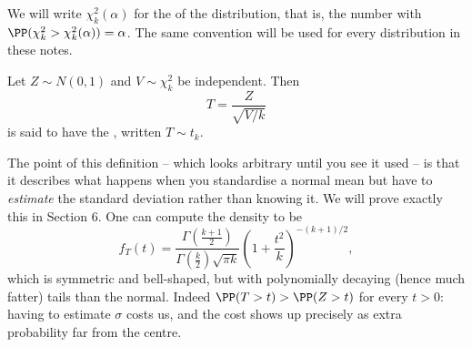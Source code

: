 We will write $\chi^2_k(\alpha)$ for the  of the distribution, that is, the number with $\PP(\chi^2_k > \chi^2_k(\alpha)) = \alpha$. The same convention will be used for every distribution in these notes.

\begin{definition}
  Let $Z \sim N(0,1)$ and $V \sim \chi^2_k$ be independent. Then
  $$
  T = \frac{Z}{\sqrt{V/k}}
  $$
  is said to have the , written $T \sim t_k$.
\end{definition}

The point of this definition -- which looks arbitrary until you see it used -- is that it describes what happens when you standardise a normal mean but have to \emph{estimate} the standard deviation rather than knowing it. We will prove exactly this in Section 6. One can compute the density to be
$$
f_T(t) = \frac{\Gamma\left(\frac{k+1}{2}\right)}{\Gamma\left(\frac{k}{2}\right)\sqrt{\pi k}}\left(1 + \frac{t^2}{k}\right)^{-(k+1)/2},
$$
which is symmetric and bell-shaped, but with polynomially decaying (hence much fatter) tails than the normal. Indeed $\PP(T > t) > \PP(Z > t)$ for every $t > 0$: having to estimate $\sigma$ costs us, and the cost shows up precisely as extra probability far from the centre.

